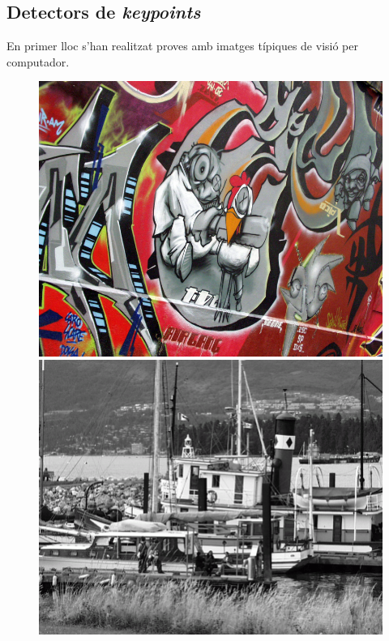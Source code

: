 	\subsection{Detectors de \textit{keypoints}}
	En primer lloc s'han realitzat proves amb imatges típiques de visió per computador.
		\begin{figure}[!htb]
				\includegraphics[width=\linewidth]{images/experiments/graf3}
				\label{fig:awesome_image1}
			\endminipage\hfill
				\includegraphics[width=\linewidth]{images/experiments/boat}
				\label{fig:awesome_image2}

\end{figure}
